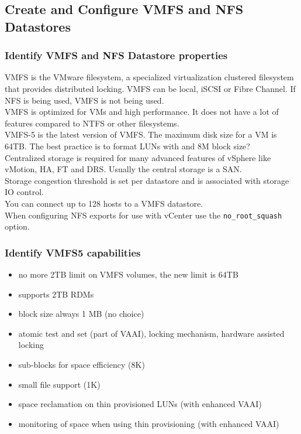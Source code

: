 \subsection{Create and Configure VMFS and NFS Datastores}

\subsubsection{Identify VMFS and NFS Datastore properties}

VMFS is the VMware filesystem, a specialized virtualization clustered
filesystem that provides distributed locking. VMFS can be local, iSCSI or
Fibre Channel. If NFS is being used, VMFS is not being used.\\

VMFS is optimized for VMs and high performance. It does not have a lot of
features compared to NTFS or other filesystems.\\

VMFS-5 is the latest version of VMFS. The maximum disk size for a VM is
64TB. The best practice is to format LUNs with and 8M block size?\\

Centralized storage is required for many advanced features of vSphere like
vMotion, HA, FT and DRS. Usually the central storage is a SAN.\\

Storage congestion threshold is set per datastore and is associated with
storage IO control.\\

You can connect up to 128 hosts to a VMFS datastore.\\

When configuring NFS exports for use with vCenter use the
\texttt{no\_root\_squash} option.

\subsubsection{Identify VMFS5 capabilities}

\begin{itemize}

\item no more 2TB limit on VMFS volumes, the new limit is 64TB
\item supports 2TB RDMs
\item block size always 1 MB (no choice)
\item atomic test and set (part of VAAI), locking mechanism, hardware assisted
locking
\item sub-blocks for space efficiency (8K)
\item small file support (1K)
\item space reclamation on thin provisioned LUNs (with enhanced VAAI)
\item monitoring of space when using thin provisioning (with enhanced VAAI)

\end{itemize}

